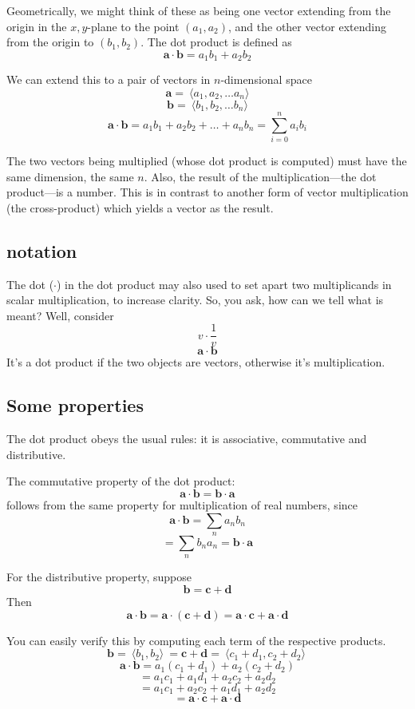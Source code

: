 \documentclass[11pt, oneside]{article}
\begin{document}
Geometrically, we might think of these as being one vector extending from the origin in the $x,y$-plane to the point $(a_1,a_2)$, and the other vector extending from the origin to $(b_1,b_2)$.  The dot product is defined as 
\[ \mathbf{a} \cdot \mathbf{b} = a_1 b_1 + a_2 b_2 \]

We can extend this to a pair of vectors in $n$-dimensional space
\[ \mathbf{a} = \ \langle a_1,a_2, \dots a_n \rangle \]
\[ \mathbf{b} = \ \langle b_1,b_2, \dots b_n \rangle \]
\[ \mathbf{a} \cdot \mathbf{b} = a_1 b_1 + a_2 b_2 + \dots + a_n b_n = \sum_{i=0}^{n} a_i b_i \]

The two vectors being multiplied (whose dot product is computed) must have the same dimension, the same $n$.  Also, the result of the multiplication---the dot product---is a number.  This is in contrast to another form of vector multiplication (the cross-product) which yields a vector as the result.

\subsection*{notation}

The dot ($\cdot$) in the dot product may also used to set apart two multiplicands in scalar multiplication, to increase clarity.  So, you ask, how can we tell what is meant?  Well, consider
\[ v \cdot \frac{1}{v} \]
\[ \mathbf{a} \cdot \mathbf{b} \]
It's a dot product if the two objects are vectors, otherwise it's multiplication.

\subsection*{Some properties}
The dot product obeys the usual rules:  it is associative, commutative and distributive.  

The commutative property of the dot product:
\[ \mathbf{a} \cdot \mathbf{b} =  \mathbf{b} \cdot \mathbf{a} \]
follows from the same property for multiplication of real numbers, since
\[ \mathbf{a} \cdot \mathbf{b} = \sum_{n} a_n b_n \]
\[ =  \sum_{n} b_n a_n =  \mathbf{b} \cdot \mathbf{a} \]

For the distributive property, suppose
\[ \mathbf{b} = \mathbf{c} + \mathbf{d} \]
Then 
\[  \mathbf{a} \cdot \mathbf{b} =  \mathbf{a} \cdot ( \mathbf{c} + \mathbf{d}) = \mathbf{a} \cdot \mathbf{c} + \mathbf{a} \cdot \mathbf{d} \]

You can easily verify this by computing each term of the respective products.
\[ \mathbf{b} = \ \langle b_1,b_2 \rangle \ = \mathbf{c} + \mathbf{d} = \ \langle c_1+d_1,c_2+d_2 \rangle \ \]  
\[  \mathbf{a} \cdot \mathbf{b} = a_1(c_1 + d_1) + a_2(c_2+d_2) \]  
\[ =  a_1 c_1 + a_1 d_1 + a_2 c_2 + a_2 d_2  \]
\[ =  a_1 c_1 + a_2 c_2 + a_1 d_1 + a_2 d_2  \]
\[ = \mathbf{a} \cdot \mathbf{c} + \mathbf{a} \cdot \mathbf{d} \]
\end{document}
